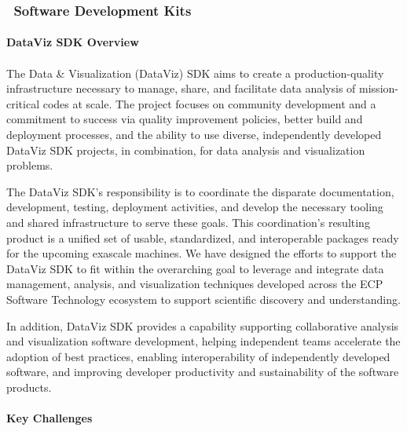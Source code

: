 \subsubsection{ \dataviz\ Software Development Kits} 

\paragraph{\textbf{DataViz SDK Overview}}
\paragraph{}

The Data \& Visualization (DataViz) SDK aims to create a production-quality infrastructure necessary to manage, share, and facilitate data analysis of mission-critical codes at scale. The project focuses on community development and a commitment to success via quality improvement policies, better build and deployment processes, and the ability to use diverse, independently developed DataViz SDK projects, in combination, for data analysis and visualization problems.

The DataViz SDK's responsibility is to coordinate the disparate documentation, development, testing, deployment activities, and develop the necessary tooling and shared infrastructure to serve these goals. This coordination's resulting product is a unified set of usable, standardized, and interoperable packages ready for the upcoming exascale machines. We have designed the efforts to support the DataViz SDK to fit within the overarching goal to leverage and integrate data management, analysis, and visualization techniques developed across the ECP Software Technology ecosystem to support scientific discovery and understanding.

In addition, DataViz SDK provides a capability supporting collaborative analysis and visualization software development, helping independent teams accelerate the adoption of best practices, enabling interoperability of independently developed software, and improving developer productivity and sustainability of the software products.

\paragraph{\textbf{Key Challenges}}
\paragraph{}


